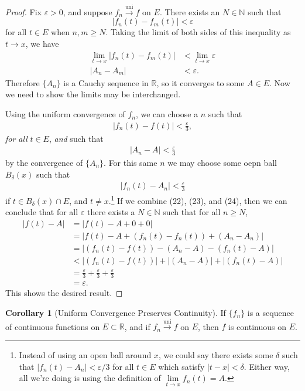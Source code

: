 \documentclass{article}
\newcommand{\N}{\mathbb{N}}
\newcommand{\R}{\mathbb{R}}
\newcommand{\uni}{\overset{\text{uni}}{\to}}
\theoremstyle{definition}
\newtheorem{corollary}{Corollary}[section]
\begin{document}
	\begin{proof}
		Fix $ \varepsilon>0 $, and suppose $ f_n\uni f $ on $ E $. There exists an $ N\in\N $ such that $$ |f_n(t)-f_m(t)|<\varepsilon$$ for all $ t\in E $ when $ n,m\ge N $. Taking the limit of both sides of this inequality as $ t\to x $, we have \begin{align*}
			\lim\limits_{t\to x}|f_n(t)-f_m(t)|&<\lim\limits_{t\to x}\varepsilon\\|A_n-A_m|&<\varepsilon.
		\end{align*}
		Therefore $ \{A_n\} $ is a Cauchy sequence in $ \R $, so it converges to some $ A\in E $. Now we need to show the limits may be interchanged.
		
		Using the uniform convergence of $ f_n $, we can choose a $ n $ such that \begin{align}
			|f_n(t)-f(t)|<\frac{\varepsilon}{3},
		\end{align}
		\textit{for all} $ t\in E $, \textit{and} such that \begin{align}
			|A_n-A|<\frac{\varepsilon}{3}
		\end{align}by the convergence of $ \{A_n\} $. For this same $ n $ we may choose some oepn ball $ B_\delta(x) $ such that\begin{align}
			|f_n(t)-A_n|<\frac{\varepsilon}{3}
		\end{align}  if $ t\in B_\delta(x)\cap E $, and $ t\neq x $.\footnote{Instead of using an open ball around $ x $, we could say there exists some $ \delta $ such that $ |f_n(t)-A_n|<\varepsilon/3 $ for all $ t\in E $ which satisfy $ |t-x|<\delta $. Either way, all we're doing is using the definition of $ \lim\limits_{t\to x}f_n(t)=A $. } If we combine (22), (23), and (24), then we can conclude that for all $ \varepsilon $ there exists a $ N\in\N $ such that for all $ n\ge N $, \begin{align*}
			|f(t)-A|&=|f(t)-A+0+0|\\&=|f(t)-A+(f_n(t)-f_n(t))+(A_n-A_n)|\\&=|(f_n(t)-f(t))-(A_n-A)-(f_n(t)-A)|\\&<|(f_n(t)-f(t))|+|(A_n-A)|+|(f_n(t)-A)| \\&=\frac{\varepsilon}{3}+\frac{\varepsilon}{3}+\frac{\varepsilon}{3}\\&=\varepsilon.
		\end{align*}
		This shows the desired result.
	\end{proof}
	\begin{corollary}[Uniform Convergence Preserves Continuity]
		If $ \{f_n\} $ is a sequence of continuous functions on $ E\subset \R $, and if $ f_n\uni f $ on $ E $, then $ f $ is continuous on $ E $.
	\end{corollary}
\end{document}
